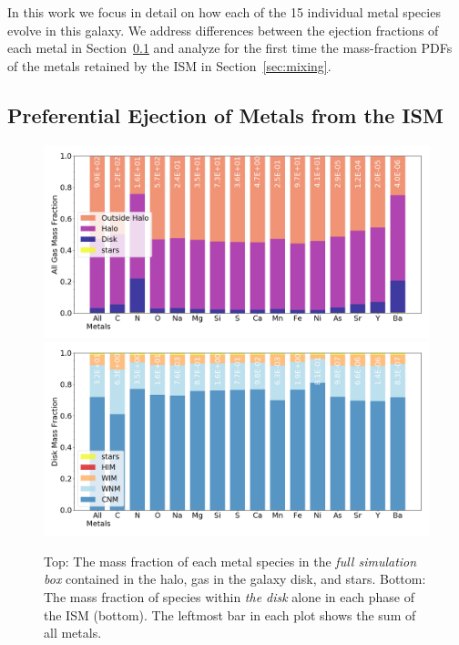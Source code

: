 In this work we focus in detail on how each of the 15 individual metal species evolve in this galaxy. We address differences between the ejection fractions of each metal in Section~\ref{sec:ejection} and analyze for the first time the mass-fraction PDFs of the metals retained by the ISM in Section~\ref{sec:mixing}.

\subsection{Preferential Ejection of Metals from the ISM}
\label{sec:ejection}

\begin{figure}
\centering
\includegraphics[width=0.99\linewidth]{figures/ch3/species_bar}\\
\includegraphics[width=0.99\linewidth]{figures/ch3/species_bar_ISM}
\caption{Top: The mass fraction of each metal species in the \textit{full simulation box} contained in the halo, gas in the galaxy disk, and stars. Bottom: The mass fraction of species within \textit{the disk} alone in each phase of the ISM (bottom). The leftmost bar in each plot shows the sum of all metals.}
\label{fig:species_fractions}
\end{figure}

